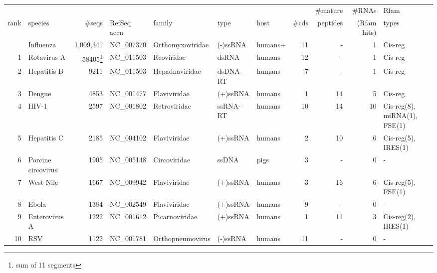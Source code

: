 
\begin{center}
\begin{tabular}{r|l|r|l|l|l|l|r|r|r|l}
       &                    &              &                &                &          &        &       & \#mature & \#RNAs     & Rfam \\ 
  rank & species            &       \#seqs & RefSeq accn    & family         & type     & host   & \#cds & peptides & (Rfam hits)& types \\ \hline
       & Influenza          & 1,009,341    & NC\_007370     & Orthomyxoviridae & (-)ssRNA & humans+&   11 &       - & 1 & Cis-reg \\ 
     1 & Rotavirus A        &58405\footnote{sum of 11 segments}& NC\_011503&Reoviridae&dsRNA&humans&   12 &       - & 1 & Cis-reg  \\ %
     2 & Hepatitis B        &         9211 & NC\_011503      & Hepadnaviridae & dsDNA-RT & humans &     7 &       - & 1 & Cis-reg \\ %
     3 & Dengue             &         4853 & NC\_001477      & Flaviviridae   & (+)ssRNA & humans &     1 &      14 & 5 & Cis-reg  \\ 
     4 & HIV-1              &        2597  & NC\_001802      & Retroviridae   & ssRNA-RT & humans &    10 &      14 & 10 & Cis-reg(8), miRNA(1), FSE(1) \\
     5 & Hepatitis C        &        2185  & NC\_004102      & Flaviviridae   & (+)ssRNA & humans &     2 &      10 & 6  & Cis-reg(5), IRES(1) \\
     6 & Porcine circovirus &        1905  & NC\_005148      & Circoviridae   & ssDNA    & pigs   &     3 &       - & 0  & - \\
     7 & West Nile          &        1667  & NC\_009942      & Flaviviridae   & (+)ssRNA & humans &     3 &      16 & 6  & Cis-reg(5), FSE(1) \\
     8 & Ebola              &        1384  & NC\_002549      & Flaviviridae   & (+)ssRNA & humans &     9 &       - & 0  & - \\ 
     9 & Enterovirus A      &        1222  & NC\_001612      & Picarnoviridae & (+)ssRNA & humans &     1 &      11 & 3  & Cis-reg(2), IRES(1) \\
    10 & RSV                &        1122  & NC\_001781      &Orthopneumovirus& (-)ssRNA & humans &    11 &       - & 0  & - \\

\end{tabular}
\end{center}
